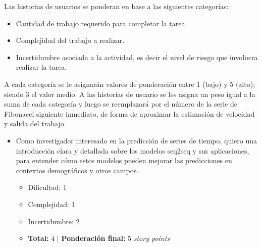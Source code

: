 \documentclass[
11pt, %
]{charter}
\begin{document}
%
%
%

Las historias de usuarios se ponderan en base a las siguientes categorías:
\begin{itemize}
	\item Cantidad de trabajo requerido para completar la tarea.
	\item Complejidad del trabajo a realizar.
	\item Incertidumbre asociada a la actividad, es decir el nivel de riesgo que involucra realizar la tarea.
\end{itemize}

A cada categoría se le asignarán valores de ponderación entre 1 (bajo) y 5 (alto), siendo 3 el valor medio. A las historias de usuario se les asigna un peso igual a la suma de cada categoría y luego se reemplazará por el número de la serie de Fibonacci siguiente inmediato, de forma de aproximar la estimación de velocidad y salida del trabajo.

\begin{itemize}
	\item Como investigador interesado en la predicción de series de tiempo, quiero una introducción clara y detallada sobre los modelos seq2seq y sus aplicaciones, para entender cómo estos modelos pueden mejorar las predicciones en contextos demográficos y otros campos.
	\begin{itemize}
		\item Dificultad: 	1
		\item Complejidad: 	1
		\item Incertidumbre: 2
		\item \textbf{Total:} 4 $|$ \textbf{Ponderación final:} 5 \textit{story points}
	\end{itemize}
\end{itemize}
\end{document}
